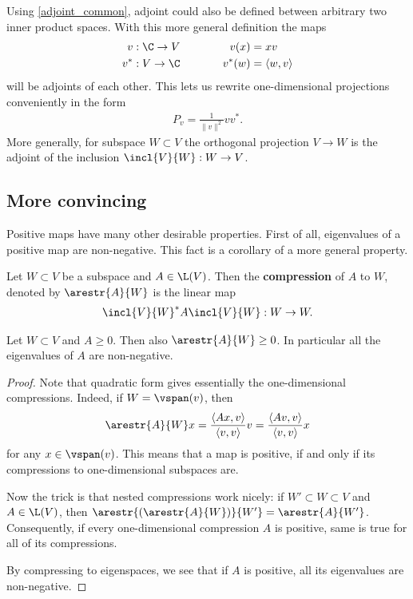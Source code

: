 Using \ref{adjoint_common}, adjoint could also be defined between arbitrary two inner product spaces. With this more general definition the maps
\begin{align*}
	v : \C \to V & \hspace{1cm} & v(x) &= x v \\
	v^{*} : V \to \C & \hspace{1cm} & v^{*}(w) &= \langle w, v \rangle
\end{align*}
will be adjoints of each other. This lets us rewrite one-dimensional projections conveniently in the form
\begin{align*}
	P_{v} = \frac{1}{\|v\|^2} v v^{*}.
\end{align*}
More generally, for subspace $W \subset V$ the orthogonal projection $V \to W$ is the adjoint of the inclusion $\incl{V}{W} : W \to V$.

\subsection{More convincing}

Positive maps have many other desirable properties. First of all, eigenvalues of a positive map are non-negative. This fact is a corollary of a more general property.

\begin{maar}
	Let $W \subset V$ be a subspace and $A \in \L(V)$. Then the \textbf{compression} of $A$ to $W$, denoted by $\arestr{A}{W}$ is the linear map
	\begin{align*}
		\incl{V}{W}^{*} A \incl{V}{W} : W \to W.
	\end{align*}
\end{maar}

\begin{lem}
	Let $W \subset V$ and $A \geq 0$. Then also $\arestr{A}{W} \geq 0$. In particular all the eigenvalues of $A$ are non-negative.
\end{lem}
\begin{proof}
	Note that quadratic form gives essentially the one-dimensional compressions. Indeed, if $W = \vspan(v)$, then
	\begin{align*}
		\arestr{A}{W} x = \frac{\langle A x, v \rangle}{\langle v, v \rangle} v = \frac{\langle A v, v \rangle}{\langle v, v \rangle} x
	\end{align*}
	for any $x \in \vspan(v)$. This means that a map is positive, if and only if its compressions to one-dimensional subspaces are.

	Now the trick is that nested compressions work nicely: if $W' \subset W \subset V$ and $A \in \L(V)$, then $\arestr{(\arestr{A}{W})}{W'} = \arestr{A}{W'}$. Consequently, if every one-dimensional compression $A$ is positive, same is true for all of its compressions.

	By compressing to eigenspaces, we see that if $A$ is positive, all its eigenvalues are non-negative.
\end{proof}

